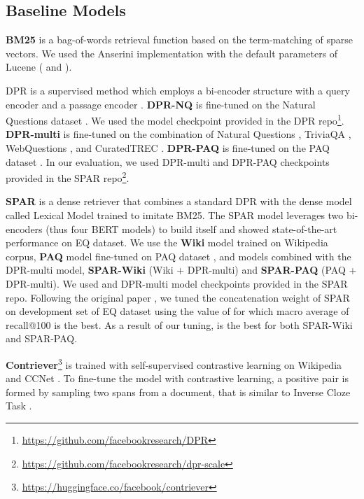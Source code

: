 \documentclass[letterpaper]{article} \usepackage{aaai23}  \usepackage{times}  \usepackage{helvet}  \usepackage{courier}  \usepackage[hyphens]{url}  \usepackage{graphicx} \urlstyle{rm} \def\UrlFont{\rm}  \usepackage{natbib}  \usepackage{caption} \frenchspacing  \setlength{\pdfpagewidth}{8.5in}  \setlength{\pdfpageheight}{11in}  \usepackage{algorithm}
\begin{document}
\subsection{Baseline Models}
\textbf{BM25} \citep{robertson2009probabilistic} is a bag-of-words retrieval function based on the term-matching of sparse vectors.
We used the Anserini \citep{anserini_Yang0L17} implementation with the default parameters of Lucene ( and ).

DPR is a supervised method which employs a bi-encoder structure with a query encoder and a passage encoder \citep{karpukhin-etal-2020-dense}.
\textbf{DPR-NQ} is fine-tuned on the Natural Questions dataset \citep{kwiatkowski-etal-2019-natural}.
We used the model checkpoint provided in the DPR repo\footnote{\url{https://github.com/facebookresearch/DPR}}.
\textbf{DPR-multi} is fine-tuned on the combination of Natural Questions \citep{kwiatkowski-etal-2019-natural}, TriviaQA \citep{joshi-etal-2017-triviaqa}, WebQuestions \citep{berant-etal-2013-semantic}, and CuratedTREC \citep{curatedtrec}.
\textbf{DPR-PAQ} is fine-tuned on the PAQ dataset \citep{lewis-etal-2021-paq}.
In our evaluation, we used DPR-multi and DPR-PAQ checkpoints provided in the SPAR repo\footnote{\url{https://github.com/facebookresearch/dpr-scale}}.

\textbf{SPAR} \citep{Chen2021SalientPA} is a dense retriever that combines a standard DPR with the dense model called Lexical Model  trained to imitate BM25.
The SPAR model leverages two bi-encoders (thus four BERT models) to build itself and showed state-of-the-art performance on EQ dataset.
We use the \textbf{Wiki}  model trained on Wikipedia corpus, \textbf{PAQ}  model fine-tuned on PAQ dataset \citep{lewis-etal-2021-paq}, and models combined with the DPR-multi model, \textbf{SPAR-Wiki} (Wiki  + DPR-multi) and \textbf{SPAR-PAQ} (PAQ  + DPR-multi).
We used  and DPR-multi model checkpoints provided in the SPAR repo.
Following the original paper \citep{Chen2021SalientPA}, we tuned the concatenation weight  of SPAR on development set of EQ dataset using the value of  for which macro average of recall@100 is the best.
As a result of our tuning,  is the best for both SPAR-Wiki and SPAR-PAQ.

\textbf{Contriever}\footnote{\url{https://huggingface.co/facebook/contriever}} \citep{contriever} is trained with self-supervised contrastive learning on Wikipedia and CCNet \citep{wenzek-etal-2020-ccnet}.
To fine-tune the model with contrastive learning, a positive pair is formed by sampling two spans from a document, that is similar to Inverse Cloze Task \citep{lee-etal-2019-latent}.
\end{document}
